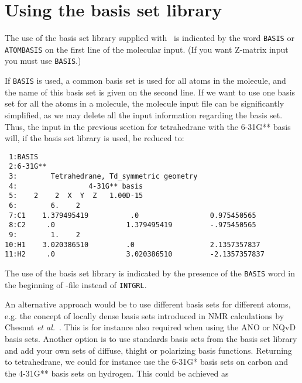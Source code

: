 \section{Using the basis set library}\label{sec:molbasis}

The use of the basis set library supplied with \dalton\ is indicated
by the word {\tt BASIS} or {\tt ATOMBASIS} on the first line of the
molecular input.
(If you want Z-matrix input you must use {\tt BASIS}.)

If {\tt BASIS} is used, a common basis set is used for all atoms in
the molecule, and the name of this basis set is given on the second line.
If we want to use one basis set for all the
atoms in a molecule, the molecule input file can be significantly
simplified, as we may delete all the input information regarding the
basis set. Thus, the input in the previous section for tetrahedrane
with the 6-31G** basis will, if the basis set library is used,  be reduced
to:

\begin{verbatim}
 1:BASIS
 2:6-31G**
 3:        Tetrahedrane, Td_symmetric geometry
 4:                 4-31G** basis
 5:    2    2  X  Y  Z   1.00D-15
 6:        6.    2
 7:C1    1.379495419          .0                 0.975450565
 8:C2     .0                 1.379495419         -.975450565
 9:        1.    2
10:H1    3.020386510         .0                  2.1357357837
11:H2     .0                 3.020386510         -2.1357357837
\end{verbatim}

The use of the basis set library is indicated by the presence of the
\verb|BASIS| word in the beginning of \mol-file instead of
\verb|INTGRL|.

An alternative approach would be to use different basis sets for
different atoms, e.g. the concept of locally
dense basis sets
introduced in NMR calculations by Chesnut {\it et
al.\/}~\cite{dbcberkdmdaejcc14}. This is for instance also required
when using the ANO or
NQvD
basis sets. Another option is to use
standards basis sets from the basis set 
library and add your own sets
of diffuse, thight or polarizing basis
functions. Returning to
tetrahedrane, we could for instance use the 6-31G* basis sets on
carbon and the 4-31G** basis sets on hydrogen. This could be achieved
as

